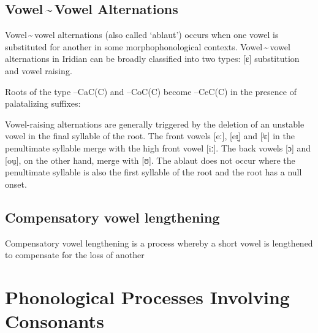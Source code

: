 \subsection{Vowel\,\sim\,Vowel Alternations}
Vowel\,\sim\,vowel alternations (also called `ablaut') occurs when one vowel is
substituted for another in some morphophonological contexts. Vowel\,\sim\,vowel
alternations in Iridian can be broadly classified into two types: [ɛ]
substitution and vowel raising.

Roots of the type --CaC(C) and --CoC(C) become --CeC(C) in the
presence of palatalizing suffixes:

\ex
{}
\xe

Vowel-raising alternations are generally triggered by the deletion of an
unstable vowel in the final syllable of the root. The front vowels [eː], [eɪ̯]
and [ʲɛ] in the penultimate syllable merge with the high front vowel [iː]. The
back vowels [ɔ] and [ou̯], on the other hand, merge with [ʊ]. The ablaut does
not occur where the penultimate syllable is also the first syllable of the root
and the root has a null onset.

\ex
{}
\xe


\subsection{Compensatory vowel lengthening}

Compensatory vowel lengthening is a process whereby a short vowel is lengthened
to compensate for the loss of another 

\section{Phonological Processes Involving Consonants}

